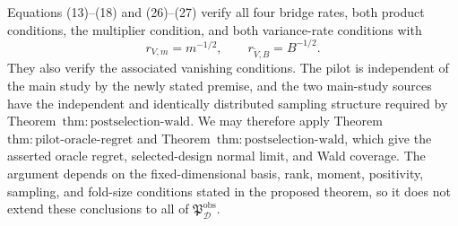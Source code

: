 Equations (13)--(18) and (26)--(27) verify all four bridge rates, both product conditions, the multiplier condition, and both variance-rate conditions with
\[
 r_{V,m}=m^{-1/2},\qquad r_{\widetilde V,B}=B^{-1/2}.
\]
They also verify the associated vanishing conditions.  The pilot is independent of the main study by the newly stated premise, and the two main-study sources have the independent and identically distributed sampling structure required by Theorem~\(\mathrm{thm{:}postselection\text{-}wald}\).  We may therefore apply Theorem~\(\mathrm{thm{:}pilot\text{-}oracle\text{-}regret}\) and Theorem~\(\mathrm{thm{:}postselection\text{-}wald}\), which give the asserted oracle regret, selected-design normal limit, and Wald coverage.  The argument depends on the fixed-dimensional basis, rank, moment, positivity, sampling, and fold-size conditions stated in the proposed theorem, so it does not extend these conclusions to all of \(\mathfrak P_{\mathcal D}^{\mathrm{obs}}\).